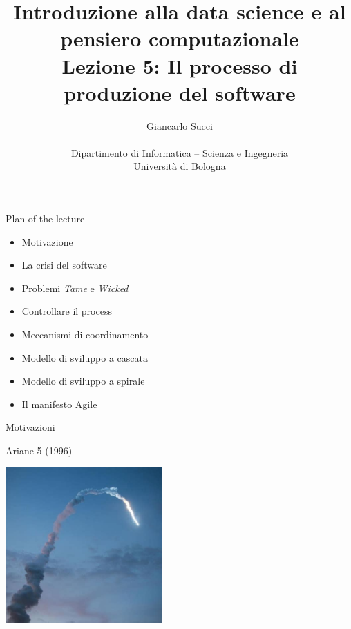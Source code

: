 \documentclass{beamer}
\title[L02]{Introduzione alla data science e al pensiero computazionale\\
Lezione 5: Il processo di produzione del software} %
\author[{\tiny Giancarlo Succi }]{Giancarlo Succi\\\\ Dipartimento di Informatica -- Scienza e Ingegneria\\Universit\`{a} di Bologna\\
\bftt{g.succi@unibo.it}
} %
\institute[unibo] %
\date{} %
\begin{document}
\begin{frame}
\titlepage %

\end{frame}




\begin{frame}
{\centerline{Plan of the lecture}}
\begin{itemize}
    \item Motivazione
    \item La crisi del software
    \item Problemi \textit{Tame} e \textit{Wicked}
    \item Controllare il process
    \item Meccanismi di coordinamento
    \item Modello di sviluppo a cascata
    \item Modello di sviluppo a spirale
    \item Il manifesto Agile
\end{itemize} 
\end{frame}

\begin{frame}{\centerline{Motivazioni}}
\begin{center}
{\Large
Ariane 5 (1996)\\
}
\end{center}
\begin{center}
\includegraphics[width=60mm]{A2022.IDSEPC.ProcessoDiProduzione/Ariane5.jpeg}
\end{center}

\end{frame}
\end{document}
